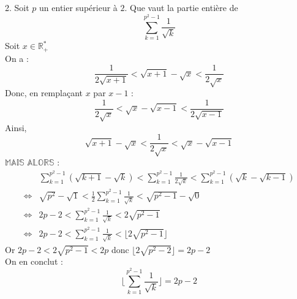 \documentclass[10pt]{article}
\begin{document}
\begin{tcolorbox}[enhanced, width=7in, center, size=fbox, fontupper=\large, drop shadow southwest]
    2. Soit $p$ un entier supérieur à $2$. Que vaut la partie entière de
    \begin{equation*}
        \sum_{k=1}^{p^2-1}{\frac{1}{\sqrt{k}}}
    \end{equation*}
    Soit $x\in\mathbb{R}^*_+$\\
    On a :
    \begin{equation*}
        \frac{1}{2\sqrt{x+1}}<\sqrt{x+1}-\sqrt{x}<\frac{1}{2\sqrt{x}}
    \end{equation*}
    Donc, en remplaçant $x$ par $x-1$ :
    \begin{equation*}
        \frac{1}{2\sqrt{x}}<\sqrt{x}-\sqrt{x-1}<\frac{1}{2\sqrt{x-1}}
    \end{equation*}
    Ainsi,
    \begin{equation*}
        \sqrt{x+1}-\sqrt{x}<\frac{1}{2\sqrt{x}}<\sqrt{x}-\sqrt{x-1}
    \end{equation*}
    $\mathbb{MAIS}$ $\mathbb{ALORS}$ :
    \begin{align*}
        &\sum^{p^2-1}_{k=1}{\left(\sqrt{k+1}-\sqrt{k}\right)}<\sum^{p^2-1}_{k=1}{\frac{1}{2\sqrt{k}}}<\sum^{p^2-1}_{k=1}{\left(\sqrt{k}-\sqrt{k-1}\right)}\\
        \iff&\sqrt{p^2}-\sqrt{1}<\frac{1}{2}\sum^{p^2-1}_{k=1}{\frac{1}{\sqrt{k}}}<\sqrt{p^2-1}-\sqrt{0}\\
        \iff&2p-2<\sum^{p^2-1}_{k=1}{\frac{1}{\sqrt{k}}}<2\sqrt{p^2-1}\\
        \iff&2p-2<\sum^{p^2-1}_{k=1}{\frac{1}{\sqrt{k}}}<\lfloor{2\sqrt{p^2-1}}\rfloor
    \end{align*}
    Or $2p-2<2\sqrt{p^2-1}<2p$ donc $\lfloor{2\sqrt{p^2-2}}\rfloor=2p-2$\\
    On en conclut : 
    \begin{equation*}
        \lfloor{\sum^{p^2-1}_{k=1}{\frac{1}{\sqrt{k}}}}\rfloor = 2p-2
    \end{equation*}
\end{tcolorbox}
\end{document}
